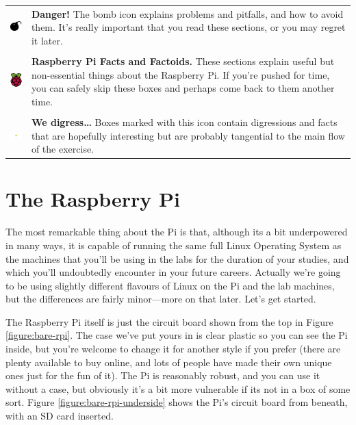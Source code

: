 \begin{tabular}{m{1.5cm}m{12cm}}
{\includegraphics[width=1.5cm]{images/bomb}} & \textbf{Danger!} The bomb icon explains problems and pitfalls, and how to avoid them. It's really important that you read these sections, or you may regret it later.\\
\\
\includegraphics[width=1.5cm]{images/rpi-logo} & \textbf{Raspberry Pi Facts and Factoids.} These sections explain useful but non-essential things about the Raspberry Pi. If you're pushed for time, you can safely skip these boxes and perhaps come back to them another time.\\
\\
\includegraphics[width=1.5cm]{images/diversion} & \textbf{We digress\ldots} Boxes marked with this icon contain digressions and facts that are hopefully interesting but are probably tangential to the main flow of the exercise.\\
\end{tabular}

\FloatBarrier 
\section{The Raspberry Pi}

The most remarkable thing about the Pi is that, although its a bit underpowered in many ways, it is capable of running the same full Linux Operating System as the machines that you'll be using in the labs for the duration of your studies, and which you'll undoubtedly encounter in your future careers. Actually we're going to be using slightly different flavours of Linux on the Pi and the lab machines, but the differences are fairly minor---more on that later. Let's get started. 

The Raspberry Pi itself is just the circuit board shown from the top in Figure \ref{figure:bare-rpi}. The case we've put yours in is clear plastic so you can see the Pi inside, but you're welcome to change it for another style if you prefer (there are plenty available to buy online, and lots of people have made their own unique ones just for the fun of it). The Pi is reasonably robust, and you can use it without a case, but obviously it's a bit more vulnerable if its not in a box of some sort. Figure \ref{figure:bare-rpi-underside} shows the Pi's circuit board from beneath, with an SD card inserted.

